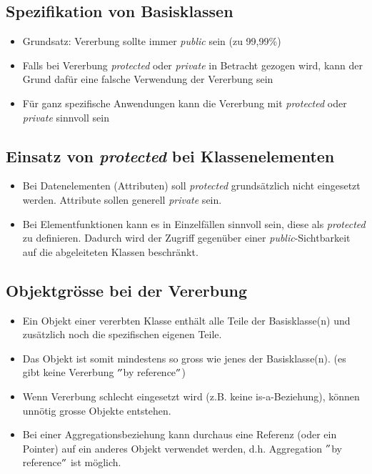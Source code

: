 \subsection{Spezifikation von Basisklassen}
\begin{itemize}
	\item Grundsatz: Vererbung sollte immer \emph{public} sein (zu 99,99\%)
	\item Falls bei Vererbung \emph{protected} oder \emph{private} in Betracht gezogen wird, kann der Grund dafür eine falsche Verwendung der Vererbung sein
	\item Für ganz spezifische Anwendungen kann die Vererbung mit \emph{protected} oder \emph{private} sinnvoll sein
\end{itemize}

\subsection{Einsatz von \emph{protected} bei Klassenelementen}
\begin{itemize}
	\item Bei Datenelementen (Attributen) soll \emph{protected} grundsätzlich nicht eingesetzt werden. Attribute sollen generell \emph{private} sein.
	\item Bei Elementfunktionen kann es in Einzelfällen sinnvoll sein, diese als \emph{protected} zu definieren. Dadurch wird der Zugriff gegenüber einer \emph{public}-Sichtbarkeit auf die abgeleiteten Klassen beschränkt.
\end{itemize}
\vfill\null
\pagebreak\newpage

\subsection{Objektgrösse bei der Vererbung}
\begin{itemize}
	\item Ein Objekt einer vererbten Klasse enthält alle Teile der Basisklasse(n) und zusätzlich noch die spezifischen eigenen Teile.
	\item Das Objekt ist somit mindestens so gross wie jenes der Basisklasse(n). (es gibt keine Vererbung $"$by reference$"$)
	\item Wenn Vererbung schlecht eingesetzt wird (z.B. keine is-a-Beziehung), können unnötig grosse Objekte entstehen.
	\item Bei einer Aggregationsbeziehung kann durchaus eine Referenz (oder ein Pointer) auf ein anderes Objekt verwendet werden, d.h. Aggregation $"$by reference$"$ ist möglich.
\end{itemize}

